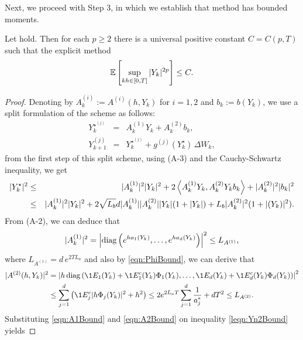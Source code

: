 	Next, we proceed with Step 3, in which we establish that \SM method has bounded moments.
\begin{lem}\label{lem:SSSMMomentBounds}
	Let  hold. Then for each $p\geq 2$ there is 
	a universal positive constant  $C=C(p,T)$ 
	such that the explicit \SM method
	\begin{equation*}
		\mathbb{E}\left[
		\sup_{kh \in [0,T]}
		|Y_k|^{2p}
		\right]\leq C.
	\end{equation*}
\end{lem}
\begin{proof}
Denoting by  $A^{(i)}_k:= A^{(i)} (h,Y_k)$ for $i=1,2$ and $b_k:=b(Y_k)$, we use
a split formulation of the \SM scheme  as follows:
\begin{eqnarray*}
	Y_{k}^{{\star}^{(j)}} &=& A^{(1)}_k Y_k + A^{(2)}_k b_k, \label{split1}\\
	Y_{k+1}^{(j)}&=& Y_k^{{\star}^{(j)}} + g^{(j)}(Y_k^{\star})\, \Delta W_k 
	\label{split2},
\end{eqnarray*}
from the first step of this split scheme, using (A-3) and 
the Cauchy-Schwartz inequality, we get
\begin{eqnarray}
|Y_k^{\star}|^{2}
&\leq&
|A^{(1)}_k |^2 |Y_k|^2  
+ 2 \left\langle A^{(1)}_k Y_k, A^{(2)}_k Y_k 
	b_k\right\rangle
+|A^{(2)}_k|^2 |b_k|^2\nonumber\\
&\leq&
|A^{(1)}_k|^2 |Y_k|^2  
+ 2 \sqrt{L_b} d|A^{(1)}_k||A^{(2)}_k||Y_k|(1+|Y_k|)
+L_b|A^{(2)}_k|^2 (1+|(Y_k)|^2).\label{leqn:Yn2Bound} 
\end{eqnarray}
From (A-2), we can deduce that
\begin{dmath}[label=eqn:A1Bound]
	|A^{(1)}_k|^2 
	=
	\left|
	\diag
	\left(
	e^{ha_1(Y_k)}, \dots, e^{ha_d(Y_k)} 
	\right)
	\right|^2
	\leq L_{A^{(1)}},		
\end{dmath}
where $L_{A^{(1)}}=d\, e^{ 2 T L_a}$ and also by \eqref{eqn:PhiBound}, we can derive that
\begin{align}
	|A^{(2)}(h,Y_k)|^2 
	&=
	\left|
	h 
	\diag
	\left(
	\1{E_1}(Y_k)
	+\1{E_1^c}(Y_k)\Phi_1(Y_k), 
	\dots,
	\1{E_d}(Y_k)
	+\1{E_d^c}(Y_k) \Phi_d(Y_k)
	\right)
	\right|^2 \notag \\
	&\leq
	\sum_{j=1}^{d}
	\left(
	\1{E_j^c}
	|h\Phi_j(Y_k)|^2
	+ h^2
	\right)
	\leq
	2 e^{2 L_a  T}
	\sum_{j=1}^d
	\frac{1}{a_j^*} + d T^2\leq L_{A^{(2)}}.
	\label{eqn:A2Bound}
\end{align}
Substituting \eqref{eqn:A1Bound} and \eqref{eqn:A2Bound}  on  inequality \eqref{leqn:Yn2Bound} yields

\end{proof}
